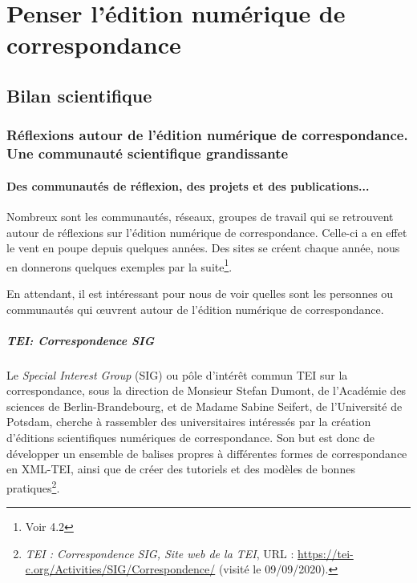 \part{Penser l'édition numérique de correspondance}




\chapter{Bilan scientifique}


\section{Réflexions autour de l’édition numérique de correspondance. Une communauté scientifique grandissante}

\subsection{Des communautés de réflexion, des projets et des publications...}


Nombreux sont les communautés, réseaux, groupes de travail qui se retrouvent autour de réflexions sur l'édition numérique de correspondance. Celle-ci a en effet le vent en poupe depuis quelques années. Des sites se créent chaque année, nous en donnerons quelques exemples par la suite\footnote{Voir 4.2}. 

En attendant, il est intéressant pour nous de voir quelles sont les personnes ou communautés qui \oe uvrent autour de l'édition numérique de correspondance. 

\subsubsection{\emph{TEI: Correspondence SIG}}

Le \emph{Special Interest Group} (SIG) ou pôle d'intérêt commun TEI sur la correspondance, sous la direction de Monsieur Stefan Dumont, de l'Académie des sciences de Berlin-Brandebourg, et de Madame Sabine Seifert, de l'Université de Potsdam, cherche à rassembler des universitaires intéressés par la création d'éditions scientifiques numériques de correspondance. Son but est donc de développer un ensemble de balises propres à différentes formes de correspondance en XML-TEI, ainsi que de créer des tutoriels et des modèles de bonnes pratiques\footnote{\emph{TEI : Correspondence SIG, Site web de la TEI}, URL : \url{https://tei-c.org/Activities/SIG/Correspondence/} (visité le 09/09/2020).}.


